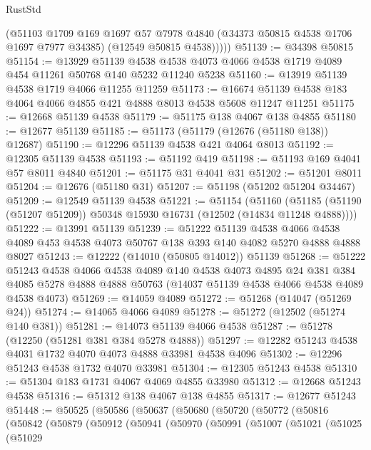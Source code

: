 \begin{lexlean}{RustStd}
\begin{coremodule}
          (@51103
            @1709
            @169
            @1697
            @57
            @7978
            @4840
            (@34373 @50815 @4538 @1706 @1697 @7977 @34385)
            (@12549 @50815 @4538)))))
@51139 := @34398 @50815
@51154 := @13929
    @51139
    @4538
    @4538
    @4073
    @4066
    @4538
    @1719
    @4089
    @454
    @11261
    @50768
    @140
    @5232
    @11240
    @5238
@51160 := @13919 @51139 @4538 @1719 @4066 @11255 @11259
@51173 := @16674 @51139 @4538 @183 @4064 @4066 @4855 @421 @4888 @8013 @4538 @5608 @11247 @11251
@51175 := @12668 @51139 @4538
@51179 := @51175 @138 @4067 @138 @4855
@51180 := @12677 @51139
@51185 := @51173 (@51179 (@12676 (@51180 @138)) @12687)
@51190 := @12296 @51139 @4538 @421 @4064 @8013
@51192 := @12305 @51139 @4538
@51193 := @51192 @419
@51198 := @51193 @169 @4041 @57 @8011 @4840
@51201 := @51175 @31 @4041 @31
@51202 := @51201 @8011
@51204 := @12676 (@51180 @31)
@51207 := @51198 (@51202 @51204 @34467)
@51209 := @12549 @51139 @4538
@51221 := @51154
    (@51160 (@51185 (@51190 (@51207 @51209)) @50348 @15930 @16731 (@12502 (@14834 @11248 @4888))))
@51222 := @13991 @51139
@51239 := @51222
    @51139
    @4538
    @4066
    @4538
    @4089
    @453
    @4538
    @4073
    @50767
    @138
    @393
    @140
    @4082
    @5270
    @4888
    @4888
    @8027
@51243 := @12222 (@14010 (@50805 @14012)) @51139
@51268 := @51222
    @51243
    @4538
    @4066
    @4538
    @4089
    @140
    @4538
    @4073
    @4895
    @24
    @381
    @384
    @4085
    @5278
    @4888
    @4888
    @50763
    (@14037 @51139 @4538 @4066 @4538 @4089 @4538 @4073)
@51269 := @14059 @4089
@51272 := @51268 (@14047 (@51269 @24))
@51274 := @14065 @4066 @4089
@51278 := @51272 (@12502 (@51274 @140 @381))
@51281 := @14073 @51139 @4066 @4538
@51287 := @51278 (@12250 (@51281 @381 @384 @5278 @4888))
@51297 := @12282 @51243 @4538 @4031 @1732 @4070 @4073 @4888 @33981 @4538 @4096
@51302 := @12296 @51243 @4538 @1732 @4070 @33981
@51304 := @12305 @51243 @4538
@51310 := @51304 @183 @1731 @4067 @4069 @4855 @33980
@51312 := @12668 @51243 @4538
@51316 := @51312 @138 @4067 @138 @4855
@51317 := @12677 @51243
@51448 := @50525
    (@50586
      (@50637
        (@50680
          (@50720
            (@50772
              (@50816
                (@50842
                  (@50879
                    (@50912
                      (@50941
                        (@50970
                          (@50991
                            (@51007
                              (@51021
                                (@51025
                                  (@51029

\end{coremodule}
\end{lexlean}
